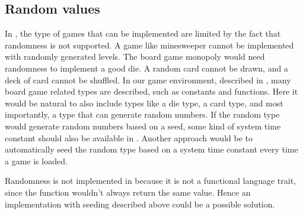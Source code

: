 \subsection{Random values}
\label{sec:artefacts}

In \productname{}, the type of games that can be implemented are limited
by the fact that randomness is not supported. A game like minesweeper
cannot be implemented with randomly generated levels. The board game
monopoly would need randomness to implement a good die. A random card
cannot be drawn, and a deck of card cannot be shuffled. In our game
environment, described in , many board game
related types are described, such as constants and functions. Here it
would be natural to also include types like a die type, a card type,
and most importantly, a type that can generate random numbers. If the
random type would generate random numbers based on a seed, some kind
of system time constant should also be available in \productname{}.
Another approach would be to automatically seed the random type based on
a system time constant every time a game is loaded.

Randomness is not implemented in \productname{} because it is not a
functional language trait, since the function wouldn't always return the
same value. Hence an implementation with seeding described above could
be a possible solution.
